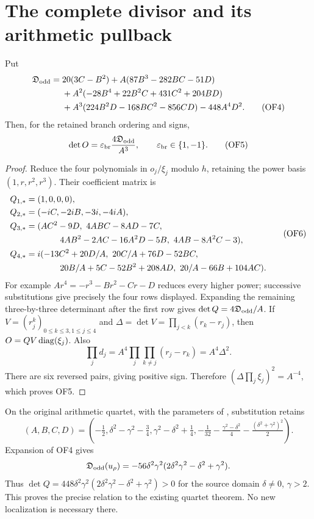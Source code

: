 \documentclass[11pt]{article}
\begin{document}
\section{The complete divisor and its arithmetic pullback}
\begin{sfrepairtheorem}
Put
\begin{align}
 \mathfrak D_{\rm odd}={}&20(3C-B^2)+A(87B^3-282BC-51D)\notag\\
 &+A^2(-28B^4+22B^2C+431C^2+204BD)\notag\\
 &+A^3(224B^2D-168BC^2-856CD)-448A^4D^2.
 \tag{OF4}
\end{align}
Then, for the retained branch ordering and signs,
\begin{equation}
 \det O=\varepsilon_{\rm br}\frac{4\mathfrak D_{\rm odd}}{A^3},\qquad
 \varepsilon_{\rm br}\in\{1,-1\}.\tag{OF5}
\end{equation}
\end{sfrepairtheorem}
\begin{proof}
Reduce the four polynomials in $o_j/\xi_j$ modulo $h$, retaining
the power basis $(1,r,r^2,r^3)$. Their coefficient matrix is
\begin{equation}
 \begin{aligned}
 Q_{1,*}&=(1,0,0,0),\\
 Q_{2,*}&=(-iC,-2iB,-3i,-4iA),\\
 Q_{3,*}&=(AC^2-9D,\ 4ABC-8AD-7C,\\
 &\hspace{14mm}4AB^2-2AC-16A^2D-5B,\ 4AB-8A^2C-3),\\
 Q_{4,*}&=i(-13C^2+20D/A,\ 20C/A+76D-52BC,\\
 &\hspace{14mm}20B/A+5C-52B^2+208AD,\ 20/A-66B+104AC).
 \end{aligned}\tag{OF6}
\end{equation}
For example $Ar^4=-r^3-Br^2-Cr-D$ reduces every higher power;
successive substitutions give precisely the four rows displayed.
Expanding the remaining three-by-three determinant after the first
row gives $\det Q=4\mathfrak D_{\rm odd}/A$. If
$V=(r_j^{k})_{0\le k\le3,1\le j\le4}$ and
$\Delta=\det V=\prod_{j<k}(r_k-r_j)$, then
$O=QV\operatorname{diag}(\xi_j)$. Also
\[
 \prod_jd_j=A^4\prod_j\prod_{k\ne j}(r_j-r_k)
 =A^4\Delta^2.
\]
There are six reversed pairs, giving positive sign. Therefore
$(\Delta\prod_j\xi_j)^2=A^{-4}$, which proves OF5.
\end{proof}

On the original arithmetic quartet, with the parameters of
\cite[GF20]{sfrepair:Fable}, substitution retains
\begin{equation}
 (A,B,C,D)=\left(-\tfrac12,\delta^2-\gamma^2-\tfrac34,
 \gamma^2-\delta^2+\tfrac14,
 -\tfrac1{32}-\tfrac{\gamma^2-\delta^2}{4}
 -\tfrac{(\delta^2+\gamma^2)^2}{2}\right).
 \tag{OF7}
\end{equation}
Expansion of OF4 gives
\[
 \mathfrak D_{\rm odd}(u_\rho)=-56\delta^2\gamma^2
                 (2\delta^2\gamma^2-\delta^2+\gamma^2).
\]
Thus $\det Q=448\delta^2\gamma^2
(2\delta^2\gamma^2-\delta^2+\gamma^2)>0$ for the source domain
$\delta\ne0$, $\gamma>2$. This proves the precise relation to the
existing quartet theorem. No new localization is necessary there.
\end{document}
